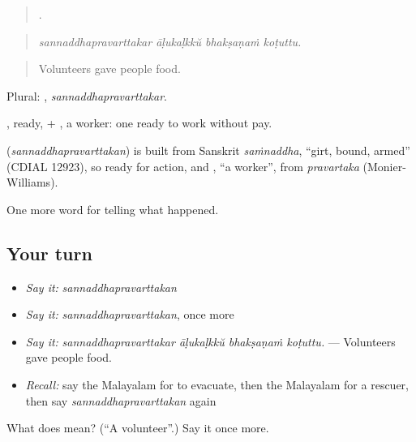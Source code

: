 \begin{quote}
   .
\end{quote}

\begin{quote}
\emph{sannaddhapravarttakar āḷukaḷkkŭ bhakṣaṇaṁ koṭuttu.}
\end{quote}

\begin{quote}
Volunteers gave people food.
\end{quote}

Plural: , \emph{sannaddhapravarttakar}.

, ready, + , a worker: one ready to work without pay.

\begin{cousinweb}
\textbf{} (\emph{sannaddhapravarttakan}) is built from Sanskrit \emph{saṁnaddha}, \textquotedblleft{}girt, bound, armed\textquotedblright{} (CDIAL 12923), so ready for action, and , \textquotedblleft{}a worker\textquotedblright{}, from \emph{pravartaka} (Monier-Williams).
\end{cousinweb}

\begin{grammarlens}[title={What you've built}]
One more word for telling what happened.
\end{grammarlens}

\subsection*{Your turn}
\begin{itemize}
\raggedright
  \item \emph{Say it:} \emph{sannaddhapravarttakan}
  \item \emph{Say it:} \emph{sannaddhapravarttakan}, once more
  \item \emph{Say it:} \emph{sannaddhapravarttakar āḷukaḷkkŭ bhakṣaṇaṁ koṭuttu.} — Volunteers gave people food.
  \item \emph{Recall:} say the Malayalam for to evacuate, then the Malayalam for a rescuer, then say \emph{sannaddhapravarttakan} again
\end{itemize}

\begin{tcolorbox}[breakable,colback=teal!4,colframe=teal!35!black,title={Before you move on}]
What does  mean? (\textquotedblleft{}A volunteer\textquotedblright{}.) Say it once more.
\end{tcolorbox}
